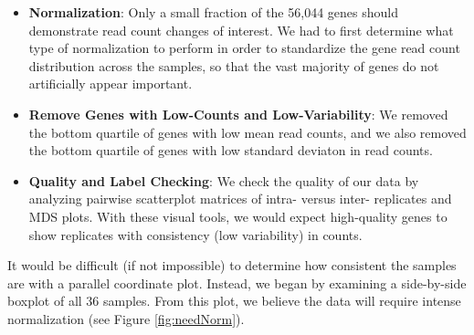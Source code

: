 \documentclass[11pt,a4paper,oldfontcommands,openany]{memoir}
\numberwithin{equation}{section} %
\begin{document}
\begin{itemize}

\item \textbf{Normalization}: Only a small fraction of the 56,044 genes should demonstrate read count changes of interest. We had to first determine what type of normalization to perform in order to standardize the gene read count distribution across the samples, so that the vast majority of genes do not artificially appear important.

\item \textbf{Remove Genes with Low-Counts and Low-Variability}: We removed the bottom quartile of genes with low mean read counts, and we also removed the bottom quartile of genes with low standard deviaton in read counts.

\item \textbf{Quality and Label Checking}: We check the quality of our data by analyzing pairwise scatterplot matrices of intra- versus inter- replicates and MDS plots. With these visual tools, we would expect high-quality genes to show replicates with consistency (low variability) in counts.

\end{itemize}

It would be difficult (if not impossible) to determine how consistent the samples are with a parallel coordinate plot. Instead, we began by examining a side-by-side boxplot of all 36 samples. From this plot, we believe the data will require intense normalization (see Figure \ref{fig:needNorm}).
\end{document}
